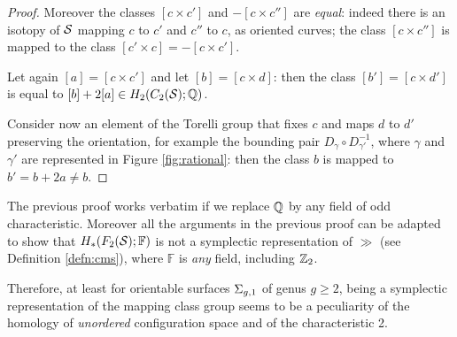 \begin{proof}
Moreover the classes $[c\times c']$ and $-[c\times c'']$ are \emph{equal}:
indeed there is an isotopy of $\S$ mapping $c$ to $c'$ and $c''$ to $c$,
as oriented curves; the class $[c\times c'']$ is mapped to the class $[c'\times c]=-[c\times c']$.

Let again $[a]=[c\times c']$ and let $[b]=[c\times d]$: then the class $[b']=[c\times d']$
is equal to $[b]+2[a]\in H_2(C_2(\S);\Q)$.

Consider now an element of the Torelli group that fixes $c$ and maps $d$ to $d'$ preserving
the orientation, for example the bounding pair $D_{\gamma}\circ D_{\gamma'}^{-1}$, where
$\gamma$ and $\gamma'$ are represented in Figure \ref{fig:rational}:
then the class $b$ is mapped to $b'=b+2a\neq b$.
\end{proof}

The previous proof works verbatim if we replace $\Q$ by any field of odd characteristic. Moreover
all the arguments in the previous proof can be adapted to show that $H_*(F_2(\S);\mathbb{F})$ is
not a symplectic representation of $\gg$ (see Definition \ref{defn:cms}), where
$\mathbb{F}$ is \emph{any} field, including $\Z_2$.

Therefore, at least for orientable surfaces $\sg$ of genus $g\geq 2$,
being a symplectic representation of the mapping class group seems to be a peculiarity
of the homology of \emph{unordered} configuration space and of the characteristic 2.